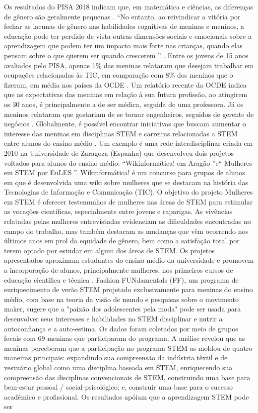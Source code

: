 Os resultados do PISA 2018 indicam que, em matemática e ciências, as diferenças de gênero são geralmente pequenas \citep{noauthor_pisa_nodate}. “No entanto, ao reivindicar a vitória por fechar as lacunas de gênero nas habilidades cognitivas de meninas e meninos, a educação pode ter perdido de vista outras dimensões sociais e emocionais sobre a aprendizagem que podem ter um impacto mais forte nas crianças, quando elas pensam sobre o que querem ser quando crescerem ” \citep{noauthor_pisa_nodate}. Entre os jovens de 15 anos avaliados pelo PISA, apenas 1\% das meninas relataram que desejam trabalhar em ocupações relacionadas às TIC, em comparação com 8\% dos meninos que o fizeram, em média nos países da OCDE \citep{noauthor_pisa_nodate}. Um relatório recente da OCDE indica que as expectativas das meninas em relação à sua futura profissão, ao atingirem os 30 anos, é principalmente a de ser médica, seguida de uma professora. Já os meninos relataram que gostariam de se tornar engenheiros, seguidos de gerente de negócios \citep{noauthor_dream_nodate}. Globalmente, é possível encontrar iniciativas que buscam aumentar o interesse das meninas em disciplinas STEM e carreiras relacionadas a STEM entre alunos do ensino médio \citep{sullivan_vex_2019, garcia-holgado_engaging_2019}. Um exemplo é uma rede interdisciplinar criada em 2010 na Universidade de Zaragoza (Espanha) que desenvolveu dois projetos voltados para alunos do ensino médio: “Wikinformática! em Aragão ”e“ Mulheres em STEM por EuLES ”. Wikinformática! é um concurso para grupos de alunos em que é desenvolvida uma wiki sobre mulheres que se destacam na história das Tecnologias de Informação e Comunicação (TIC). O objetivo do projeto Mulheres em STEM é oferecer testemunhos de mulheres nas áreas de STEM para estimular as vocações científicas, especialmente entre jovens e raparigas. As vivências relatadas pelas mulheres entrevistadas evidenciam as dificuldades encontradas no campo do trabalho, mas também destacam as mudanças que vêm ocorrendo nos últimos anos em prol da equidade de gênero, bem como a satisfação total por terem optado por estudar em algum dos áreas de STEM. Os projetos apresentados aproximam estudantes do ensino médio da universidade e promovem a incorporação de alunos, principalmente mulheres, nos primeiros cursos de educação científica e técnica \citep{allueva-pinilla_projects_2019}. Fashion FUNdamentals (FF), um programa de enriquecimento de verão STEM projetado exclusivamente para meninas do ensino médio, com base na teoria da visão de mundo e pesquisas sobre o movimento maker, sugere que a "paixão dos adolescentes pela moda" pode ser usada para desenvolver seus interesses e habilidades no STEM disciplinar e nutrir a autoconfiança e a auto-estima. Os dados foram coletados por meio de grupos focais com 69 meninas que participaram do programa. A análise revelou que as meninas perceberam que a participação no programa STEM as moldou de quatro maneiras principais: expandindo sua compreensão da indústria têxtil e de vestuário global como uma disciplina baseada em STEM, enriquecendo sua compreensão das disciplinas convencionais de STEM, construindo uma base para bem-estar pessoal / social-psicológico; e, construir uma base para o sucesso acadêmico e profissional. Os resultados apóiam que a aprendizagem STEM pode ser 